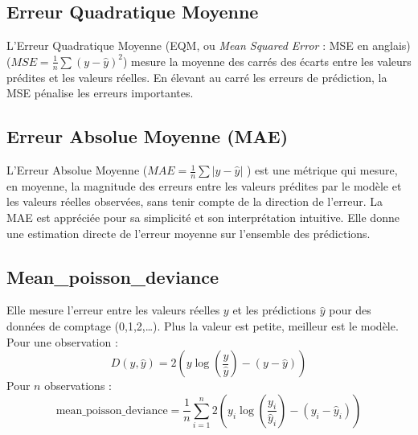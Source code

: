 \subsection{Erreur Quadratique Moyenne}
L'Erreur Quadratique Moyenne (EQM, ou \textit{Mean Squared Error} : MSE en anglais) 
($MSE = \frac{1}{n} \sum(y - \hat{y})^2$) 
mesure la moyenne des carrés des écarts entre les valeurs prédites et les valeurs 
réelles. En élevant au carré les erreurs de prédiction, la MSE pénalise les 
erreurs importantes. 


\subsection{Erreur Absolue Moyenne (MAE) }

L'Erreur Absolue Moyenne ($MAE= \frac{1}{n} \sum|y - \hat{y}|$ ) est une métrique 
qui mesure, en moyenne, la magnitude des erreurs entre les valeurs prédites par 
le modèle et les valeurs 
réelles observées, sans tenir compte de la direction de l'erreur. 
La MAE est appréciée pour sa simplicité et son interprétation intuitive. Elle donne 
une estimation directe de l'erreur moyenne sur l'ensemble des prédictions. 

\subsection{Mean\_poisson\_deviance}
Elle mesure l'erreur entre les valeurs réelles $y$ et les prédictions 
$\hat{y}$ pour des données de comptage (0,1,2,\dots). Plus la valeur est petite, 
meilleur est le modèle.
Pour une observation :
\[
D(y, \hat{y}) = 2 \left( y \log\left(\frac{y}{\hat{y}}\right) - (y - \hat{y}) \right)
\]
Pour $n$ observations :
\[
\text{mean\_poisson\_deviance} = \frac{1}{n} \sum_{i=1}^{n} 2 \left( y_i \log\left(\frac{y_i}{\hat{y}_i}\right) - (y_i - \hat{y}_i) \right)
\]


